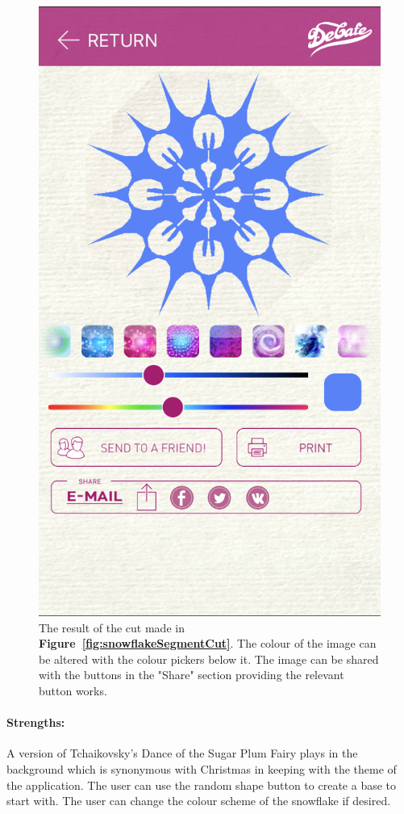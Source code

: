 \documentclass[11pt]{article}
\begin{document}
\begin{figure}[!ht]
\begin{minipage}{0.45\textwidth}
                            \includegraphics[width=0.7\linewidth]{Images/snowflakeResult}
                            \caption{The result of the cut made in \textbf{Figure~\ref{fig:snowflakeSegmentCut}}. The colour of the image can be altered with the colour pickers below it. The image can be shared with the buttons in the "Share" section providing the relevant button works.}
                            \label{fig:snowflakeResult}
                        \end{minipage}
                    \end{figure}
                    
                    
                    
                \paragraph{Strengths:}
                A version of Tchaikovsky's Dance of the Sugar Plum Fairy plays in the background which is synonymous with Christmas in keeping with the theme of the application. 
                The user can use the random shape button to create a base to start with. The user can change the colour scheme of the snowflake if desired.
                
\end{document}
